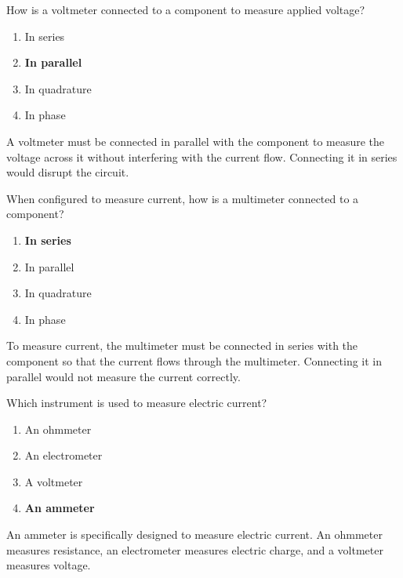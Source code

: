 \begin{tcolorbox}[colback=gray!10!white,colframe=black!75!black,title={T7D02}]
    How is a voltmeter connected to a component to measure applied voltage?
    \begin{enumerate}[label=\Alph*,noitemsep]
        \item In series
        \item \textbf{In parallel}
        \item In quadrature
        \item In phase
    \end{enumerate}
\end{tcolorbox}
A voltmeter must be connected in parallel with the component to measure the voltage across it without interfering with the current flow. Connecting it in series would disrupt the circuit.

\begin{tcolorbox}[colback=gray!10!white,colframe=black!75!black,title={T7D03}]
    When configured to measure current, how is a multimeter connected to a component?
    \begin{enumerate}[label=\Alph*,noitemsep]
        \item \textbf{In series}
        \item In parallel
        \item In quadrature
        \item In phase
    \end{enumerate}
\end{tcolorbox}
To measure current, the multimeter must be connected in series with the component so that the current flows through the multimeter. Connecting it in parallel would not measure the current correctly.

\begin{tcolorbox}[colback=gray!10!white,colframe=black!75!black,title={T7D04}]
    Which instrument is used to measure electric current?
    \begin{enumerate}[label=\Alph*,noitemsep]
        \item An ohmmeter
        \item An electrometer
        \item A voltmeter
        \item \textbf{An ammeter}
    \end{enumerate}
\end{tcolorbox}
An ammeter is specifically designed to measure electric current. An ohmmeter measures resistance, an electrometer measures electric charge, and a voltmeter measures voltage.

